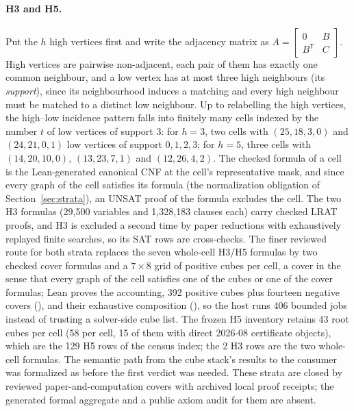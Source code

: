 \documentclass{anvil-paper}
\theoremstyle{definition}
\begin{document}
\paragraph{H3 and H5.} Put the $h$ high vertices first and write the adjacency matrix as $A=\left[\begin{smallmatrix}0&B\\B^{\mathsf T}&C\end{smallmatrix}\right]$. High vertices are pairwise non-adjacent, each pair of them has exactly one common neighbour, and a low vertex has at most three high neighbours (its \emph{support}), since its neighbourhood induces a matching and every high neighbour must be matched to a distinct low neighbour. Up to relabelling the high vertices, the high--low incidence pattern falls into finitely many cells indexed by the number $t$ of low vertices of support 3: for $h=3$, two cells with $(25,18,3,0)$ and $(24,21,0,1)$ low vertices of support $0,1,2,3$; for $h=5$, three cells with $(14,20,10,0)$, $(13,23,7,1)$ and $(12,26,4,2)$. The checked formula of a cell is the Lean-generated canonical CNF at the cell's representative mask, and since every graph of the cell satisfies its formula (the normalization obligation of Section~\ref{sec:strata}), an UNSAT proof of the formula excludes the cell. The two H3 formulas (29,500 variables and 1,328,183 clauses each) carry checked LRAT proofs, and H3 is excluded a second time by paper reductions with exhaustively replayed finite searches, so its SAT rows are cross-checks. The finer reviewed route for both strata replaces the seven whole-cell H3/H5 formulas by two checked cover formulas and a $7\times 8$ grid of positive cubes per cell, a cover in the sense that every graph of the cell satisfies one of the cubes or one of the cover formulas; Lean proves the accounting, 392 positive cubes plus fourteen negative covers (), and their exhaustive composition (), so the host runs 406 bounded jobs instead of trusting a solver-side cube list. The frozen H5 inventory retains 43 root cubes per cell (58 per cell, 15 of them with direct 2026-08 certificate objects), which are the 129 H5 rows of the census index; the 2 H3 rows are the two whole-cell formulas. The semantic path from the cube stack's  results to the consumer was formalized as  before the first verdict was needed. These strata are closed by reviewed paper-and-computation covers with archived local proof receipts; the generated formal aggregate and a public axiom audit for them are absent.
\end{document}
